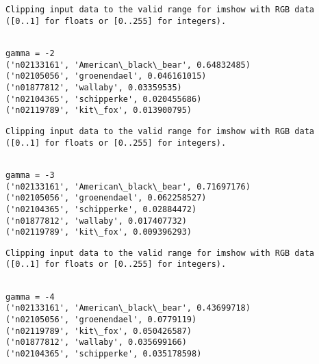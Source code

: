 \documentclass[11pt]{article}
\begin{document}
    \begin{Verbatim}[commandchars=\\\{\}]
Clipping input data to the valid range for imshow with RGB data ([0..1] for floats or [0..255] for integers).

    \end{Verbatim}

    \begin{Verbatim}[commandchars=\\\{\}]

gamma = -2
('n02133161', 'American\_black\_bear', 0.64832485)
('n02105056', 'groenendael', 0.046161015)
('n01877812', 'wallaby', 0.03359535)
('n02104365', 'schipperke', 0.020455686)
('n02119789', 'kit\_fox', 0.013900795)

    \end{Verbatim}

    \begin{Verbatim}[commandchars=\\\{\}]
Clipping input data to the valid range for imshow with RGB data ([0..1] for floats or [0..255] for integers).

    \end{Verbatim}

    \begin{Verbatim}[commandchars=\\\{\}]

gamma = -3
('n02133161', 'American\_black\_bear', 0.71697176)
('n02105056', 'groenendael', 0.062258527)
('n02104365', 'schipperke', 0.02884472)
('n01877812', 'wallaby', 0.017407732)
('n02119789', 'kit\_fox', 0.009396293)

    \end{Verbatim}

    \begin{Verbatim}[commandchars=\\\{\}]
Clipping input data to the valid range for imshow with RGB data ([0..1] for floats or [0..255] for integers).

    \end{Verbatim}

    \begin{Verbatim}[commandchars=\\\{\}]

gamma = -4
('n02133161', 'American\_black\_bear', 0.43699718)
('n02105056', 'groenendael', 0.0779119)
('n02119789', 'kit\_fox', 0.050426587)
('n01877812', 'wallaby', 0.035699166)
('n02104365', 'schipperke', 0.035178598)

    \end{Verbatim}
\end{document}
